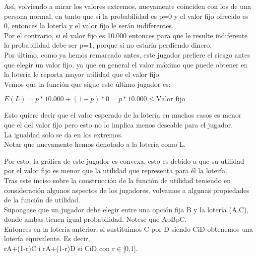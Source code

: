 \documentclass[10pt,a4paper]{book}
\begin{document}
Así, volviendo a mirar los valores extremos, nuevamente coinciden con los de una persona normal, en tanto que si la probabilidad es p=0 y el valor fijo ofrecido es 0, entonces la lotería y el valor fijo le serán indiferentes.\\
Por el contrario, si el valor fijo es 10.000 entonces para que le resulte indiferente la probabilidad debe ser p=1, porque si no estaría perdiendo dinero.\\

Por último, como ya hemos remarcado antes, este jugador prefiere el riesgo antes que elegir un valor fijo, ya que en general el valor máximo que puede obtener en la lotería le reporta mayor utilidad que el valor fijo.\\

Vemos que la función que sigue este último jugador es:\\

\begin{center}

$E(L)=p*10.000+(1-p)*0=p*10.000 \leq \mbox{Valor fijo}$

Esto quiere decir que el valor esperado de la lotería en muchos casos es menor que el del valor fijo pero esto no lo implica menos deseable para el jugador.\\

La igualdad solo se da en los extremos.\\

Notar que nuevamente hemos denotado a la lotería como L.\\

\end{center}

Por esto, la gráfica de este jugador es convexa, esto es debido a que su utilidad por el valor fijo es menor que la utilidad que representa para él la lotería.\\



Tras este inciso sobre la construcción de la función de utilidad teniendo en consideración algunos aspectos de los jugadores, volvamos a algunas propiedades de la función de utilidad.\\

Supongase que un jugador debe elegir entre una opción fija B y la lotería (A,C), donde ambas tienen igual probabilidad. Notese que ApBpC.\\

Entonces en la lotería anterior, si sustituimos C por D siendo CiD obtenemos una lotería equivalente. Es decir,\\
{rA+(1-r)C} i {rA+(1-r)D} si CiD con r$\in$[0,1]. \\
\end{document}

